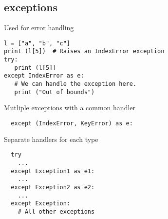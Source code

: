 \subsection{exceptions}
Used for error handling

\begin{lstlisting}
l = ["a", "b", "c"]
print (l[5])  # Raises an IndexError exception
try:
   print (l[5])
except IndexError as e:
   # We can handle the exception here. 
   print ("Out of bounds")
\end{lstlisting}
Mutliple exceptions with a common handler\\
\begin{lstlisting}
  except (IndexError, KeyError) as e:
\end{lstlisting}
Separate handlers for each type
\begin{lstlisting}
  try
    ...
  except Exception1 as e1:
    ...
  except Exception2 as e2:
    ...
  except Exception:
    # All other exceptions
\end{lstlisting}

